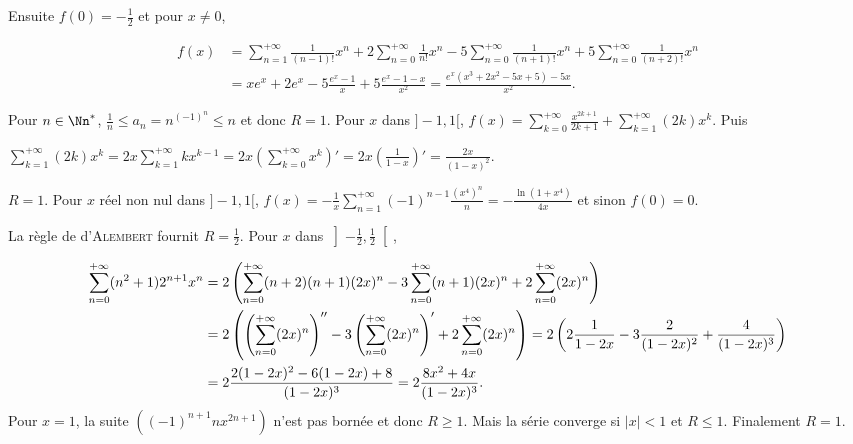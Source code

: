 {{Ensuite $f(0) = -\frac{1}{2}$  et pour $x\neq 0$,

\begin{align*}
f(x)&=\sum_{n=1}^{+\infty}\frac{1}{(n-1)!}x^n +2\sum_{n=0}^{+\infty}\frac{1}{n!}x^n- 5\sum_{n=0}^{+\infty}\frac{1}{(n+1)!}x^n+ 5\sum_{n=0}^{+\infty}\frac{1}{(n+2)!}x^n\\
 &= xe^x + 2e^x -5\frac{e^x-1}{x}+ 5\frac{e^x-1-x}{x^2}= \frac{e^x(x^3+2x^2-5x+5) -5x}{x^2}.
\end{align*}

\begin{center}
\end{center}
Pour $n\in\Nn^*$,  $\frac{1}{n}\leqslant a_n=n^{(-1)^n}\leqslant n$ et donc $R = 1$. Pour $x$ dans $]-1,1[$, $f(x)=\sum_{k=0}^{+\infty}\frac{x^{2k+1}}{2k+1}+\sum_{k=1}^{+\infty}(2k)x^k$. Puis 

\begin{center}
$\sum_{k=1}^{+\infty}(2k)x^k= 2x\sum_{k=1}^{+\infty}kx^{k-1}= 2x\left(\sum_{k=0}^{+\infty}x^k\right)'= 2x\left(\frac{1}{1-x}\right)'=\frac{2x}{(1-x)^2}$.
\end{center}

\begin{center}
\shadowbox{
$\forall x\in]-1,1[$, $\sum_{n=1}^{+\infty}n^{(-1)^n}x^n=\Argth x+\frac{2x}{(1-x)^2}$.
}
\end{center}
$R = 1$. Pour $x$ réel non nul dans $]-1,1[$, $f(x)=-\frac{1}{x}\sum_{n=1}^{+\infty}(-1)^{n-1}\frac{(x^4)^n}{n}= -\frac{\ln(1+x^4)}{4x}$ et sinon $f(0) = 0$.

\begin{center}
\shadowbox{
$\forall x\in]-1,1[$, $\sum_{n=1}^{+\infty}(-1)^n\frac{x^{4n-1}}{4n}=\left\{
\begin{array}{l}
-\frac{\ln(1+x^4)}{4x}\;\text{si}\;x\neq0\\
\rule{0mm}{4mm}0\;\text{si}\;x=0
\end{array}
\right.$.
}
\end{center}
La règle de d'\textsc{Alembert} fournit $R=\frac{1}{2}$. Pour $x$ dans $\left]-\frac{1}{2},\frac{1}{2}\right[$,

\begin{align*}\ensuremath
\sum_{n=0}^{+\infty}(n^2+1)2^{n+1}x^n&=2\left(\sum_{n=0}^{+\infty}(n+2)(n+1)(2x)^n -3\sum_{n=0}^{+\infty}(n+1)(2x)^n +2\sum_{n=0}^{+\infty}(2x)^n\right)\\
  &= 2\left(\left(\sum_{n=0}^{+\infty}(2x)^n\right)''- 3\left(\sum_{n=0}^{+\infty}(2x)^n\right)'+2\sum_{n=0}^{+\infty}(2x)^n\right)
 = 2\left(2\frac{1}{1-2x}  - 3\frac{2}{(1-2x)^2}+\frac{4}{(1-2x)^3}\right)\\
 &=2\frac{2(1-2x)^2-6(1-2x)+8}{(1-2x)^3}=2\frac{8x^2+4x}{(1-2x)^3}.
\end{align*}
Pour $x = 1$, la suite $((-1)^{n+1}nx^{2n+1})$ n'est pas bornée et donc $R\geqslant 1$. Mais la série converge si $|x| < 1$ et $R\leqslant 1$. Finalement $R=1$.

}}
